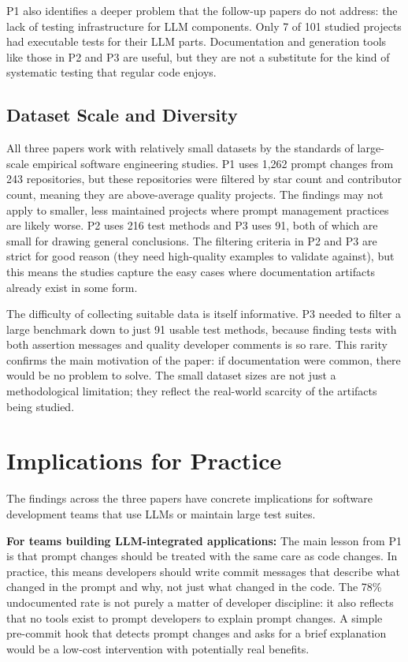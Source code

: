 \documentclass[
    pdftex,
    final,
    11pt,
    a4paper,
    parskip=false,
    oneside,
    footheight=0mm,
    footinclude=false,
    toc=bibliography
]{scrbook}
\begin{document}
P1 also identifies a deeper problem that the follow-up papers do not address: the lack of testing infrastructure for LLM components. Only 7 of 101 studied projects had executable tests for their LLM parts. Documentation and generation tools like those in P2 and P3 are useful, but they are not a substitute for the kind of systematic testing that regular code enjoys.

\subsection{Dataset Scale and Diversity}

All three papers work with relatively small datasets by the standards of large-scale empirical software engineering studies. P1 uses 1,262 prompt changes from 243 repositories, but these repositories were filtered by star count and contributor count, meaning they are above-average quality projects. The findings may not apply to smaller, less maintained projects where prompt management practices are likely worse. P2 uses 216 test methods and P3 uses 91, both of which are small for drawing general conclusions. The filtering criteria in P2 and P3 are strict for good reason (they need high-quality examples to validate against), but this means the studies capture the easy cases where documentation artifacts already exist in some form.

The difficulty of collecting suitable data is itself informative. P3 needed to filter a large benchmark down to just 91 usable test methods, because finding tests with both assertion messages and quality developer comments is so rare. This rarity confirms the main motivation of the paper: if documentation were common, there would be no problem to solve. The small dataset sizes are not just a methodological limitation; they reflect the real-world scarcity of the artifacts being studied.

\section{Implications for Practice}

The findings across the three papers have concrete implications for software development teams that use LLMs or maintain large test suites.

\textbf{For teams building LLM-integrated applications:} The main lesson from P1 is that prompt changes should be treated with the same care as code changes. In practice, this means developers should write commit messages that describe what changed in the prompt and why, not just what changed in the code. The 78\% undocumented rate is not purely a matter of developer discipline: it also reflects that no tools exist to prompt developers to explain prompt changes. A simple pre-commit hook that detects prompt changes and asks for a brief explanation would be a low-cost intervention with potentially real benefits.
\end{document}
